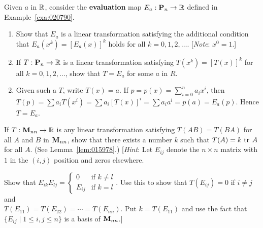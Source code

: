 \begin{multicols}{2}
\begin{ex}
\begin{enumerate}
\end{enumerate}
\end{ex}

\begin{ex}
Given $a$ in $\mathbb{R}$, consider the \textbf{evaluation} map $E_{a} : \textbf{P}_{n} \to \mathbb{R}$ defined in Example~\ref{exa:020790}.


\begin{enumerate}[label={\alph*.}]
\item Show that $E_{a}$ is a linear transformation satisfying the additional condition that $E_{a}(x^{k}) = \left[E_{a}(x)\right]^{k}$ holds for all $k = 0, 1, 2, \dots$. [\textit{Note}: $x^{0} = 1$.]

\item If $T : \textbf{P}_{n} \to \mathbb{R}$ is a linear transformation satisfying $T(x^{k}) = \left[T(x)\right]^{k}$ for all $k = 0, 1, 2, \dots$, show that $T = E_{a}$ for some $a$ in $R$.

\end{enumerate}
\begin{sol}
\begin{enumerate}[label={\alph*.}]
\setcounter{enumi}{1}
\item Given such a $T$, write $T(x) = a$. If $p = p(x) = \sum_{i=0}^{n}a_{i}x^{i}$, then $T(p) = \sum a_{i}T(x^i) = \sum a_i\left[T(x)\right]^i = \sum a_{i}a^i = p(a) = E_a(p)$. Hence $T = E_a$.

\end{enumerate}
\end{sol}
\end{ex}

\begin{ex}
If $T : \textbf{M}_{nn} \to \mathbb{R}$ is any linear transformation satisfying $T(AB) = T(BA)$ for all $A$ and $B$ in $\textbf{M}_{nn}$, show that there exists a number $k$ such that $T(A) = k \thinspace\operatorname{tr \medspace}A$ for all $A$. (See Lemma~\ref{lem:015978}.) [\textit{Hint}: Let $E_{ij}$ denote the $n \times n$ matrix with $1$ in the $(i, j)$ position and zeros elsewhere.


Show that $E_{ik}E_{lj} = \left\lbrace \begin{array}{cl}
0 & \mbox{if } k \neq l \\
E_{ij} & \mbox{if } k = l
\end{array} \right.$.
 Use this to show that $T(E_{ij}) = 0$ if $i \neq j$ and \\ $T(E_{11}) = T(E_{22}) = \cdots = T(E_{nn})$. Put $k = T(E_{11})$ and use the fact that $\{E_{ij} \mid 1 \leq i, j \leq n\}$ is a basis of $\textbf{M}_{nn}$.]
\end{ex}


\end{multicols}
